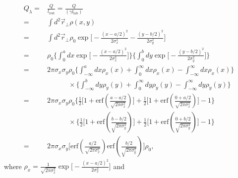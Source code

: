 \documentclass[11pt,oneside]{article}
\begin{document}
\begin{equation}
\begin{split}
  Q_{\lambda}
= & \frac{Q}{l_{\text{rest}}}
=   \frac{Q}{(\gamma l_{\text{lab}})} \\
= & \int d^{2} \vec{r}_{\perp} \rho (x,y)  \\
= & \int d^{2} \vec{r}_{\perp} \rho_{0} 
    \exp \Bigg[
       - \frac{ \left( x - a/2 \right)^{2} }{ 2\sigma_{x}^{2}}
       - \frac{ \left( y - b/2 \right)^{2} }{ 2\sigma_{y}^{2}}
         \Bigg] \\
= & \rho_{0}
    \Bigg\{
      \int_{0}^{a} dx
      \exp \bigg[ - \frac{ \left( x - a/2 \right)^{2} }{ 2\sigma_{x}^{2}}
           \bigg]
    \Bigg\}
    \Bigg\{
      \int_{0}^{b} dy
      \exp \bigg[ - \frac{ \left( y - b/2 \right)^{2} }{ 2\sigma_{y}^{2}}
           \bigg]
    \Bigg\} \\
= & 2 \pi \sigma_{x} \sigma_{y} \rho_{0}
    \Bigg\{
      \int_{-\infty}^{a} dx \rho_{x} (x)
    + \int_{0}^{\infty} dx \rho_{x} (x)
    - \int_{-\infty}^{\infty} dx \rho_{x} (x)
    \Bigg\} \\
  & \;\;\;\;\;\;\;\;\;\;\;
    \times
    \Bigg\{
      \int_{-\infty}^{b} dy \rho_{y} (y)
    + \int_{0}^{\infty} dy \rho_{y} (y)
    - \int_{-\infty}^{\infty} dy \rho_{y} (y)
    \Bigg\} \\
= & 2 \pi \sigma_{x} \sigma_{y} \rho_{0}
    \Bigg\{
      \frac{1}{2}
      \bigg[
        1 + \mbox{erf} \left( \frac{a-a/2}{\sqrt{2 \pi \sigma_{x}^{2}}} \right)
      \bigg]
    + \frac{1}{2}
      \bigg[
        1 + \mbox{erf} \left( \frac{0+a/2}{\sqrt{2 \pi \sigma_{x}^{2}}} \right)
      \bigg]
    - 1
    \Bigg\} \\
  & \;\;\;\;\;\;\;\;\;\;\;
    \times
    \Bigg\{
      \frac{1}{2}
      \bigg[
        1 + \mbox{erf} \left( \frac{b-b/2}{\sqrt{2 \pi \sigma_{y}^{2}}} \right)
      \bigg]
    + \frac{1}{2}
      \bigg[
        1 + \mbox{erf} \left( \frac{0+b/2}{\sqrt{2 \pi \sigma_{y}^{2}}} \right)
      \bigg]
    - 1
    \Bigg\} \\
= & 2 \pi \sigma_{x} \sigma_{y}
    \Bigg[
      \mbox{erf} \left( \frac{a/2}{\sqrt{2 \pi \sigma_{x}^{2}}} \right)
      \mbox{erf} \left( \frac{b/2}{\sqrt{2 \pi \sigma_{y}^{2}}} \right) 
    \Bigg]
    \rho_{0} , 
\end{split}
\end{equation}
where $\rho_{x} = \frac{1}{\sqrt{2 \pi \sigma_{x}^{2}}} 
                  \exp \bigg[ - \frac{ \left( x - a/2 \right)^{2} }
                                     { 2\sigma_{x}^{2}} \bigg] $ and 
\end{document}
